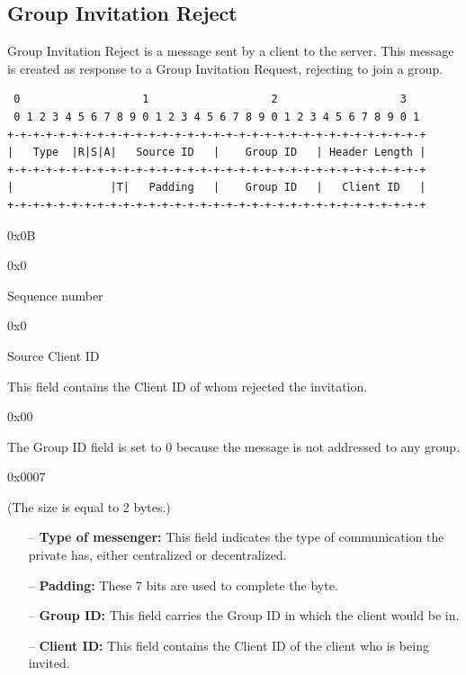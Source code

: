 \documentclass{article}
\begin{document}
\subsection{Group Invitation Reject}
Group Invitation Reject is a message sent by a client to the server. This message is created as response to a Group Invitation Request, rejecting to join a group. 
\begin{verbatim}  
 0                   1                   2                   3  
 0 1 2 3 4 5 6 7 8 9 0 1 2 3 4 5 6 7 8 9 0 1 2 3 4 5 6 7 8 9 0 1
+-+-+-+-+-+-+-+-+-+-+-+-+-+-+-+-+-+-+-+-+-+-+-+-+-+-+-+-+-+-+-+-+
|   Type  |R|S|A|   Source ID   |    Group ID   | Header Length |
+-+-+-+-+-+-+-+-+-+-+-+-+-+-+-+-+-+-+-+-+-+-+-+-+-+-+-+-+-+-+-+-+
|               |T|   Padding   |    Group ID   |   Client ID   |
+-+-+-+-+-+-+-+-+-+-+-+-+-+-+-+-+-+-+-+-+-+-+-+-+-+-+-+-+-+-+-+-+
\end{verbatim}
\begin{description}[align=left]
    \item [Type:] 0x0B
    
    \item [Reserved:] 0x0
        
    \item [Sequence:] Sequence number
    
    \item [Acknowledgement:] 0x0
     
    \item [Source ID:] Source Client ID
    \begin{flushleft}
        This field contains the Client ID of whom rejected the invitation. 
    \end{flushleft}
    
    \item [Group ID:] 0x00
    \begin{flushleft}
        The Group ID field is set to 0 because the message is not addressed to any group.
    \end{flushleft}
    
    \item [Header Length:] 0x0007

    \item[Options:] (The size is equal to 2 bytes.)
    \begin{itemize}
        \item[--]\textbf{Type of messenger:} This field indicates the type of communication the private has, either centralized or decentralized.
        \item[--]\textbf{Padding:} These 7 bits are used to complete the byte.
        \item[--]\textbf{Group ID:} This field carries the Group ID in which the client would be in. 
        \item[--]\textbf{Client ID:} This field contains the Client ID of the client who is being invited.
    \end{itemize}
\end{description}
\end{document}

